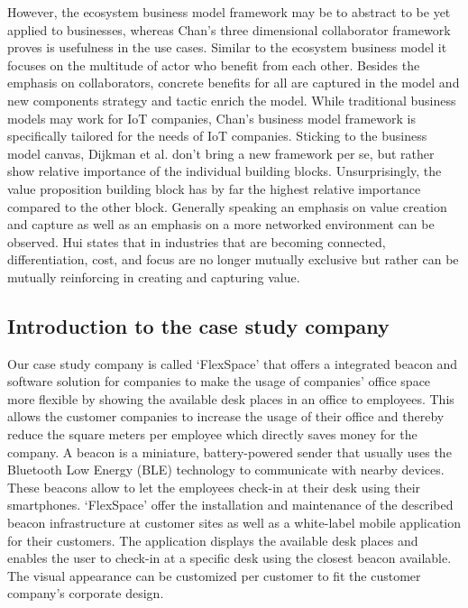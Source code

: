	However, the ecosystem business model framework may be to abstract to be yet applied to businesses, whereas  Chan's three dimensional collaborator framework proves is usefulness in the use cases. Similar to the ecosystem business model it focuses on the multitude of actor who benefit from each other. Besides the emphasis on collaborators, concrete benefits for all are captured in the model and new components strategy and tactic enrich the model. While traditional business models may work for IoT companies, Chan's  business model framework is specifically tailored for the needs of IoT companies. Sticking to the business model canvas, Dijkman et al. \cite{dijkman} don't bring a new framework per se, but rather show relative importance of the individual building blocks. Unsurprisingly, the value proposition building block has by far the highest relative importance compared to the other block. Generally speaking an emphasis on value creation and capture as well as an emphasis on a more networked environment can be observed. Hui \cite{hui} states that in industries that are becoming connected, differentiation, cost, and focus are no longer mutually exclusive but rather can be mutually reinforcing in creating and capturing value.




	\subsection{Introduction to the case study company}
	Our case study company is called `FlexSpace' that offers a integrated beacon and software solution for companies to make the usage of companies' office space more flexible by showing the available desk places in an office to employees. This allows the customer companies to increase the usage of their office and thereby reduce the square meters per employee which directly saves money for the company. A beacon is a miniature, battery-powered sender that usually uses the Bluetooth Low Energy (BLE) technology to communicate with nearby devices. These beacons allow to let the employees check-in at their desk using their smartphones. `FlexSpace' offer the installation and maintenance of the described beacon infrastructure at customer sites as well as a white-label mobile application for their customers. The application displays the available desk places and enables the user to check-in at a specific desk using the closest beacon available. The visual appearance can be customized per customer to fit the customer company's corporate design.

